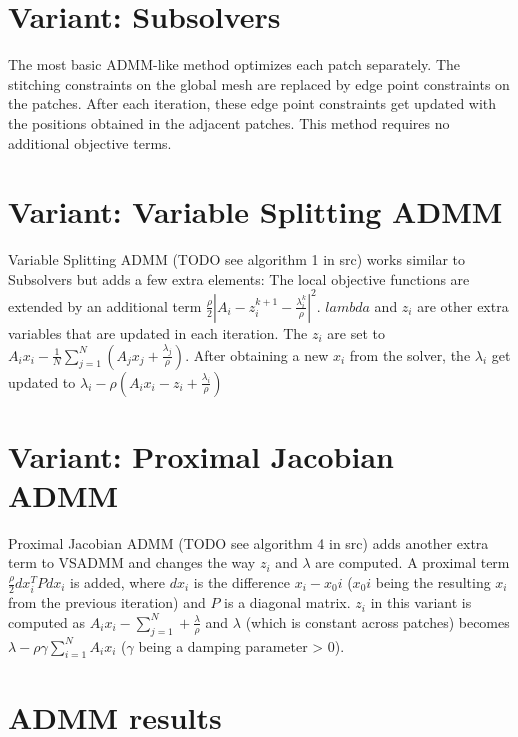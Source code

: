 \documentclass[a4paper,twoside,12pt,nochapterprefix]{scrbook}
\begin{document}
\section{Variant: Subsolvers}
The most basic ADMM-like method optimizes each patch separately. The stitching constraints on the global mesh are replaced by edge point constraints on the patches. After each iteration, these edge point constraints get updated with the positions obtained in the adjacent patches. This method requires no additional objective terms.\newline
\section{Variant: Variable Splitting ADMM}
Variable Splitting ADMM (TODO see algorithm 1 in src) works similar to Subsolvers but adds a few extra elements: The local objective functions%
 are extended by an additional term $\frac{\rho}{2}|A_i - z^{k+1}_i -\frac{\lambda_i^k}{\rho} |^2$. $lambda$ and $z_i$ are other extra variables that are updated in each iteration. The $z_i$ are set to $A_i x_i - \frac{1}{N}\sum_{j=1}^N(A_j x_j + \frac{\lambda_j}{\rho})$. After obtaining a new $x_i$ from the solver, the $\lambda_i$ get updated to $\lambda_i - \rho(A_i x_i - z_i +\frac{\lambda_i}{\rho})$
\section{Variant: Proximal Jacobian ADMM}
Proximal Jacobian ADMM (TODO see algorithm 4 in src) adds another extra term to VSADMM and changes the way $z_i$ and $\lambda$ are computed. A proximal term $\frac{\rho}{2} dx_i^T P dx_i$ is added, where $dx_i$ is the difference $x_i - x_0i$ ($x_0i$ being the resulting $x_i$ from the previous iteration) and $P$ is a diagonal matrix. $z_i$ in this variant is computed as $A_i x_i - \sum_{j=1}^N + \frac{\lambda}{\rho}$ and $\lambda$ (which is constant across patches) becomes $\lambda - \rho \gamma \sum_{i=1}^N A_i x_i$ ($\gamma$ being a damping parameter > 0).
\section{ADMM results}
\end{document}
